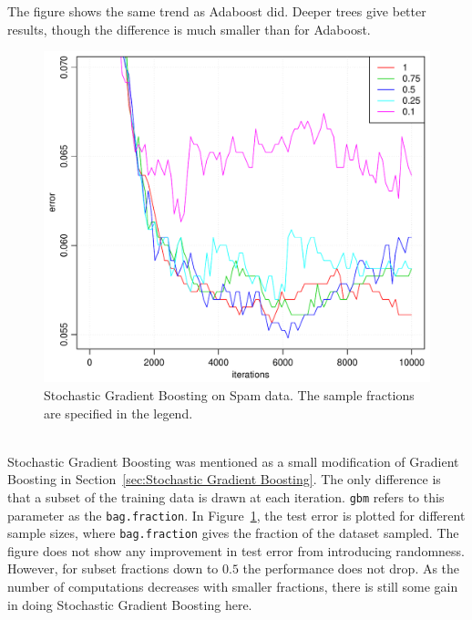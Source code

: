 The figure shows the same trend as Adaboost did. Deeper trees give better results, though the difference is much smaller than for Adaboost.
\\
%
\begin{figure}[htbp]
\begin{center}
    \includegraphics[scale=0.5]{./figures/gradboostSpamStoch.pdf}
\end{center}
\caption{Stochastic Gradient Boosting on Spam data. The sample fractions are specified in the legend.}
\label{fig:StochasticGradBoost}
\end{figure}
\\
Stochastic Gradient Boosting was mentioned as a small modification of Gradient Boosting in Section~\ref{sec:Stochastic Gradient Boosting}. The only difference is that a subset of the training data is drawn at each iteration. \verb+gbm+ refers to this parameter as the \verb+bag.fraction+. In Figure~\ref{fig:StochasticGradBoost}, the test error is plotted for different sample sizes, where \verb+bag.fraction+ gives the fraction of the dataset sampled. The figure does not show any improvement in test error from introducing randomness. However, for subset fractions down to $0.5$ the performance does not drop. As the number of computations decreases with smaller fractions, there is still some gain in doing Stochastic Gradient Boosting here.


